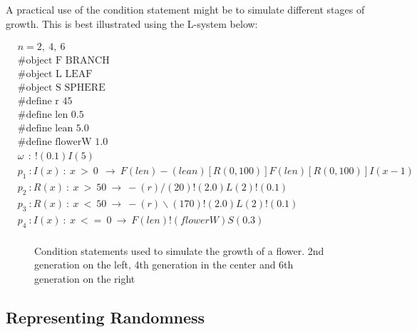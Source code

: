 \begin{flushleft}
\vspace{5mm}

A practical use of the condition statement might be to simulate different stages of growth. This is best illustrated using the L-system below: \\

\vspace{5mm}

\begin{equation} \label{conditional l-system example}
\begin{aligned}
	&n=2,~4,~6 \\
	&\#\text{object F BRANCH} \\
 	&\#\text{object L LEAF} \\
	&\#\text{object S SPHERE} \\
	&\#\text{define r 45} \\
	&\#\text{define len 0.5} \\
	&\#\text{define lean 5.0} \\
	&\#\text{define flowerW 1.0} \\
	&\omega~~ :~ !(0.1)I(5)\\
	&p_1~ :  I(x)~ :~ x~ >~ 0~~ \rightarrow~ F(len)-(lean)[R({0, 100})]F(len)[R({0, 100})]I(x-1)\\
	&p_2~ :  R(x)~ :~ x~ >~ 50~ \rightarrow~ -(r)/(20)!(2.0)L(2)!(0.1)\\
	&p_3~ :  R(x)~ :~ x~ <~ 50~ \rightarrow~ -(r)\backslash(170)!(2.0)L(2)!(0.1)\\
	&p_4~ :  I(x)~ :~ x~ <=~ 0~ \rightarrow~ F(len)!(flowerW)S(0.3)\\
\end{aligned}
\end{equation}

\begin{figure}[htbp]
	{\centering
		\vspace{7px}
		\setlength{\fboxrule}{1pt}
		\caption{Condition statements used to simulate the growth of a flower. 2nd generation on the left, 4th generation in the center and 6th generation on the right}
	}
\end{figure}

\FloatBarrier

\end{flushleft}


\subsection{Representing Randomness} \label{Randomness L-system Subsection}

